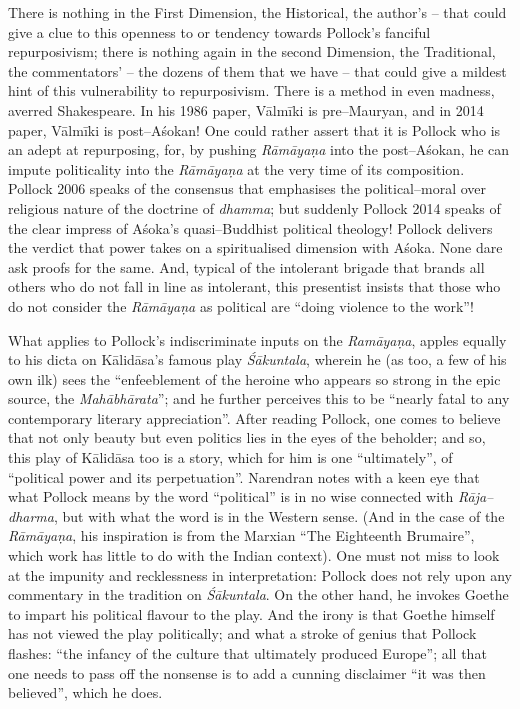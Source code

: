 {{There is nothing in the First Dimension, the Historical, the author’s – that could give a clue to this openness to or tendency towards Pollock’s fanciful repurposivism; there is nothing again in the second Dimension, the Traditional, the commentators’ – the dozens of them that we have – that could give a mildest hint of this vulnerability to repurposivism. There is a method in even madness, averred Shakespeare. In his 1986 paper, Vālmīki is pre–Mauryan, and in 2014 paper, Vālmīki is post–Aśokan! One could rather assert that it is Pollock who is an adept at repurposing, for, by pushing \textit{Rāmāyaṇa} into the post–Aśokan, he can impute politicality into the \textit{Rāmāyaṇa} at the very time of its composition. Pollock 2006 speaks of the consensus that emphasises the political–moral over religious nature of the doctrine of \textit{dhamma}; but suddenly Pollock 2014 speaks of the clear impress of Aśoka’s quasi–Buddhist political theology! Pollock delivers the verdict that power takes on a spiritualised dimension with Aśoka. None dare ask proofs for the same. And, typical of the intolerant brigade that brands all others who do not fall in line as intolerant, this presentist insists that those who do not consider the \textit{Rāmāyaṇa} as political are “doing violence to the work”!

What applies to Pollock’s indiscriminate inputs on the \textit{Ramāyaṇa}, apples equally to his dicta on Kālidāsa’s famous play \textit{Śākuntala}, wherein he (as too, a few of his own ilk) sees the “enfeeblement of the heroine who appears so strong in the epic source, the \textit{Mahābhārata}”; and he further perceives this to be “nearly fatal to any contemporary literary appreciation”. After reading Pollock, one comes to believe that not only beauty but even politics lies in the eyes of the beholder; and so, this play of Kālidāsa too is a story, which for him is one “ultimately”, of “political power and its perpetuation”. Narendran notes with a keen eye that what Pollock means by the word “political” is in no wise connected with \textit{Rāja–dharma}, but with what the word is in the Western sense. (And in the case of the \textit{Rāmāyaṇa}, his inspiration is from the Marxian “The Eighteenth Brumaire”, which work has little to do with the Indian context). One must not miss to look at the impunity and recklessness in interpretation: Pollock does not rely upon any commentary in the tradition on \textit{Śākuntala}. On the other hand, he invokes Goethe to impart his political flavour to the play. And the irony is that Goethe himself has not viewed the play politically; and what a stroke of genius that Pollock flashes: “the infancy of the culture that ultimately produced Europe”; all that one needs to pass off the nonsense is to add a cunning disclaimer “it was then believed”, which he does.

}}
